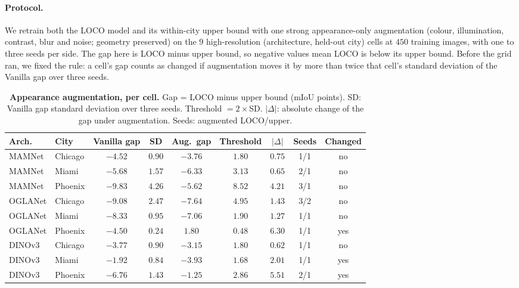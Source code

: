 \paragraph{Protocol.} We retrain both the LOCO model and its within-city upper
bound with one strong appearance-only augmentation (colour, illumination,
contrast, blur and noise; geometry preserved) on the $9$ high-resolution
(architecture, held-out city) cells at $450$ training images, with one to three
seeds per side.  The gap here is LOCO minus upper bound, so negative values
mean LOCO is below its upper bound.  Before the grid ran, we fixed the rule: a
cell's gap counts as changed if augmentation moves it by more than twice that
cell's standard deviation of the Vanilla gap over three seeds.

\begin{table}[h]
\centering
\caption{\textbf{Appearance augmentation, per cell.} Gap = LOCO minus upper
bound (mIoU points).  SD: Vanilla gap standard deviation over three seeds.
Threshold $= 2\times$SD.  $|\Delta|$: absolute change of the gap under
augmentation.  Seeds: augmented LOCO/upper.}
\label{tab:aug-stress}
\small
\setlength{\tabcolsep}{4pt}
\begin{tabular}{llccccccc}
\toprule
Arch. & City & Vanilla gap & SD & Aug.\ gap & Threshold & $|\Delta|$ & Seeds & Changed \\
\midrule
MAMNet & Chicago & $-4.52$ & $0.90$ & $-3.76$ & $1.80$ & $0.75$ & 1/1 & no \\
MAMNet & Miami & $-5.68$ & $1.57$ & $-6.33$ & $3.13$ & $0.65$ & 2/1 & no \\
MAMNet & Phoenix & $-9.83$ & $4.26$ & $-5.62$ & $8.52$ & $4.21$ & 3/1 & no \\
OGLANet & Chicago & $-9.08$ & $2.47$ & $-7.64$ & $4.95$ & $1.43$ & 3/2 & no \\
OGLANet & Miami & $-8.33$ & $0.95$ & $-7.06$ & $1.90$ & $1.27$ & 1/1 & no \\
OGLANet & Phoenix & $-4.50$ & $0.24$ & $1.80$ & $0.48$ & $6.30$ & 1/1 & yes \\
DINOv3 & Chicago & $-3.77$ & $0.90$ & $-3.15$ & $1.80$ & $0.62$ & 1/1 & no \\
DINOv3 & Miami & $-1.92$ & $0.84$ & $-3.93$ & $1.68$ & $2.01$ & 1/1 & yes \\
DINOv3 & Phoenix & $-6.76$ & $1.43$ & $-1.25$ & $2.86$ & $5.51$ & 2/1 & yes \\
\bottomrule
\end{tabular}
\end{table}

